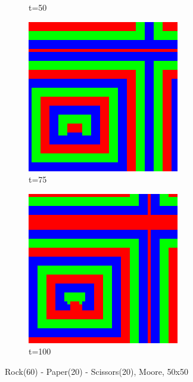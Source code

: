 \documentclass[a4paper, 11pt]{article}
\begin{document}
\begin{landscape}
\begin{figure}[H]
\begin{subfigure}{.20\textwidth}
  \caption{t=50}
\end{subfigure}%
\begin{subfigure}{.20\textwidth}
  \centering
  \includegraphics[width=0.95\linewidth]{ROCK_PAPER_SCISSORS_MOORE_50x50_HighRockPop60_t75}
  \caption{t=75}
\end{subfigure}%
\begin{subfigure}{.20\textwidth}
  \centering
  \includegraphics[width=0.95\linewidth]{ROCK_PAPER_SCISSORS_MOORE_50x50_HighRockPop60_t100}
  \caption{t=100}
\end{subfigure}
\caption{Rock(60) - Paper(20) - Scissors(20), Moore, 50x50}
\end{figure}



\end{landscape}
\end{document}
